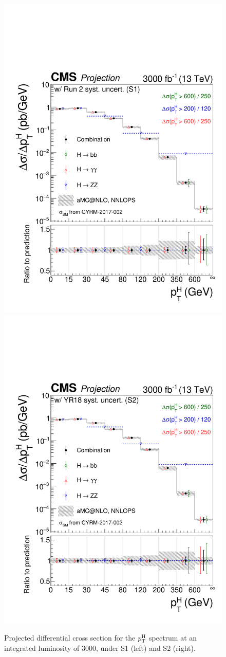 \begin{figure}[hbtp]
  \begin{center}
    \includegraphics[width=0.49\linewidth]{img/projections/projectionspectra_pth_smH.pdf}
    \includegraphics[width=0.49\linewidth]{img/projections/projectionspectra_pth_smH_scenario2.pdf}
    \caption{
        Projected differential cross section for the $p_\mathrm{T}^\mathrm{H}$ spectrum at an integrated luminosity of 3000\fbinv, under S1 (left) and S2 (right).
        }
    \label{fig:proj_pth}
  \end{center}
\end{figure}


